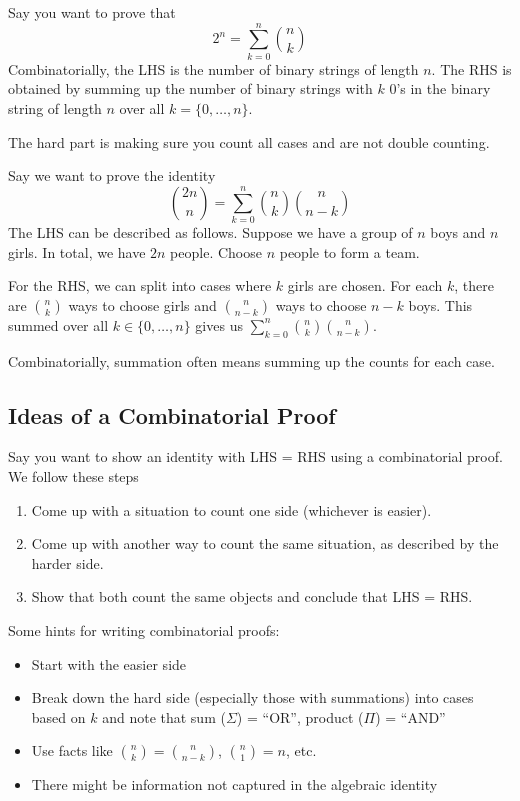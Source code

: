 Say you want to prove that
$$
2^n = \sum_{k=0}^n \binom{n}{k}
$$
Combinatorially, the LHS is the number of binary strings of length $n$. The RHS is obtained by summing up the number of binary strings with $k$ 0's in the binary string of length $n$ over all $k = \{0,\ldots,n\}$.

\begin{remark}
    The hard part is making sure you count all cases and are not double counting.
\end{remark}

\begin{example}
    Say we want to prove the identity
    $$
    \binom{2n}{n} = \sum_{k=0}^n \binom{n}{k} \binom{n}{n-k}
    $$
    The LHS can be described as follows. Suppose we have a group of $n$ boys and $n$ girls. In total, we have $2n$ people. Choose $n$ people to form a team.

    For the RHS, we can split into cases where $k$ girls are chosen. For each $k$, there are $\binom{n}{k}$ ways to choose girls and $\binom{n}{n-k}$ ways to choose $n-k$ boys. This summed over all $k \in \{0,\ldots,n\}$ gives us $\sum_{k=0}^n \binom{n}{k} \binom{n}{n-k}$.
\end{example}

\begin{remark}
    Combinatorially, summation often means summing up the counts for each case.
\end{remark}

\subsection{Ideas of a Combinatorial Proof}

Say you want to show an identity with LHS = RHS using a combinatorial proof. We follow these steps
\begin{enumerate}
    \item Come up with a situation to count one side (whichever is easier).
    \item Come up with another way to count the same situation, as described by the harder side.
    \item Show that both count the same objects and conclude that LHS = RHS.
\end{enumerate}

\begin{remark}
    Some hints for writing combinatorial proofs:
    \begin{itemize}
        \item Start with the easier side
        \item Break down the hard side (especially those with summations) into cases based on $k$ and note that sum ($\Sigma$) = ``OR'', product ($\Pi$) = ``AND''
        \item Use facts like $\binom{n}{k} = \binom{n}{n-k}$, $\binom{n}{1} = n$, etc.
        \item There might be information not captured in the algebraic identity
    \end{itemize}
\end{remark}

